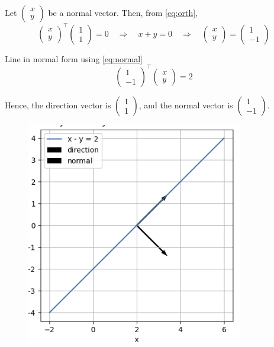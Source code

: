 \documentclass[journal]{IEEEtran}
\begin{document}
Let $\begin{pmatrix} x \\ y \end{pmatrix}$ be a normal vector. Then, from \eqref{eq:orth},
\begin{equation}
\begin{pmatrix} x \\ y \end{pmatrix}^{\!\top}
\begin{pmatrix} 1 \\ 1 \end{pmatrix}
= 0
\quad\Longrightarrow\quad
x + y = 0
\quad\Longrightarrow\quad
\begin{pmatrix} x \\ y \end{pmatrix}
=
\begin{pmatrix} 1 \\ -1 \end{pmatrix}
\label{eq:normal-inst}
\end{equation}

Line in normal form using \eqref{eq:normal} 
\[
\begin{pmatrix} 1 \\ -1 \end{pmatrix}^{\!\top}
\begin{pmatrix} x \\ y \end{pmatrix}
= 2
\]


Hence, the direction vector is
$\displaystyle \begin{pmatrix} 1 \\ 1 \end{pmatrix}$,
and the normal vector is
$\displaystyle \begin{pmatrix} 1 \\ -1 \end{pmatrix}$.

\begin{figure}[H]
    \centering
    \includegraphics[width=\columnwidth]{figs/mg4plot.png}
\end{figure}
\end{document}
